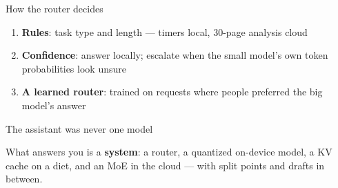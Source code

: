 \begin{frame}{How the router decides}
  \vspace{0.6em}
  \raggedright
  \begin{enumerate}[<+->]\itemsep6pt
    \item \textbf{Rules}: task type and length --- timers local,
      30-page analysis cloud
    \item \textbf{Confidence}: answer locally; escalate when the small model's
      own token probabilities look unsure
    \item \textbf{A learned router}: trained on requests where people preferred
      the big model's answer
  \end{enumerate}

  \vspace{0.7em}
\end{frame}

\begin{frame}{The assistant was never one model}
  \vspace{1.0em}
  \raggedright
  What answers you is a \textbf{system}: a router, a quantized on-device model,
  a KV cache on a diet, and an MoE in the cloud --- with split points and
  drafts in between.\par

  \vspace{1.0em}
\end{frame}
